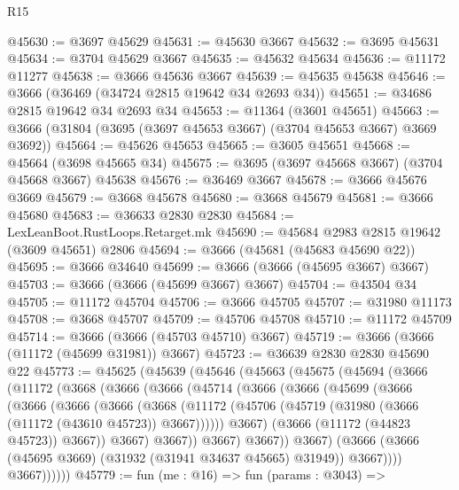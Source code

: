 \begin{lexlean}{R15}
\begin{coremodule}
@45630 := @3697 @45629
@45631 := @45630 @3667
@45632 := @3695 @45631
@45634 := @3704 @45629 @3667
@45635 := @45632 @45634
@45636 := @11172 @11277
@45638 := @3666 @45636 @3667
@45639 := @45635 @45638
@45646 := @3666 (@36469 (@34724 @2815 @19642 @34 @2693 @34))
@45651 := @34686 @2815 @19642 @34 @2693 @34
@45653 := @11364 (@3601 @45651)
@45663 := @3666 (@31804 (@3695 (@3697 @45653 @3667) (@3704 @45653 @3667) @3669 @3692))
@45664 := @45626 @45653
@45665 := @3605 @45651
@45668 := @45664 (@3698 @45665 @34)
@45675 := @3695 (@3697 @45668 @3667) (@3704 @45668 @3667) @45638
@45676 := @36469 @3667
@45678 := @3666 @45676 @3669
@45679 := @3668 @45678
@45680 := @3668 @45679
@45681 := @3666 @45680
@45683 := @36633 @2830 @2830
@45684 := LexLeanBoot.RustLoops.Retarget.mk
@45690 := @45684 @2983 @2815 @19642 (@3609 @45651) @2806
@45694 := @3666 (@45681 (@45683 @45690 @22))
@45695 := @3666 @34640
@45699 := @3666 (@3666 (@45695 @3667) @3667)
@45703 := @3666 (@3666 (@45699 @3667) @3667)
@45704 := @43504 @34
@45705 := @11172 @45704
@45706 := @3666 @45705
@45707 := @31980 @11173
@45708 := @3668 @45707
@45709 := @45706 @45708
@45710 := @11172 @45709
@45714 := @3666 (@3666 (@45703 @45710) @3667)
@45719 := @3666 (@3666 (@11172 (@45699 @31981)) @3667)
@45723 := @36639 @2830 @2830 @45690 @22
@45773 := @45625
    (@45639
      (@45646
        (@45663
          (@45675
            (@45694
              (@3666
                (@11172
                  (@3668
                    (@3666
                      (@3666
                        (@45714
                          (@3666
                            (@3666
                              (@45699
                                (@3666
                                  (@3666
                                    (@3666
                                      (@3666
                                        (@3668
                                          (@11172
                                            (@45706
                                              (@45719
                                                (@31980 (@3666 (@11172 (@43610 @45723)) @3667))))))
                                        @3667)
                                      (@3666 (@11172 (@44823 @45723)) @3667))
                                    @3667)
                                  @3667))
                              @3667)
                            @3667))
                        @3667)
                      (@3666 (@3666 (@45695 @3669) (@31932 (@31941 @34637 @45665) @31949)) @3667))))
                @3667))))))
@45779 := fun (me : @16) =>
  fun (params : @3043) =>

\end{coremodule}
\end{lexlean}
